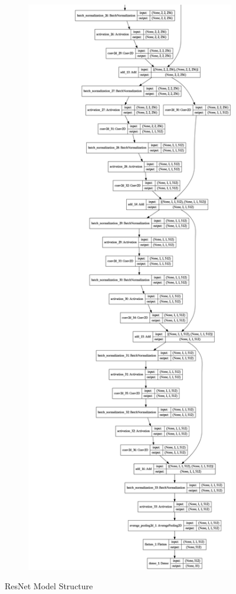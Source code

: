 \begin{figure}[ht]
\begin{subfigure}{.24\linewidth}
        \label{subfig:model2}
    \end{subfigure}
    \begin{subfigure}{.24\linewidth}
    \centering
        \includegraphics[scale=.1]{graphics/model_cropped_3.png}
        \label{subfig:model3}
    \end{subfigure}
    \caption{ResNet Model Structure}
    \label{fig:model}
\end{figure}


